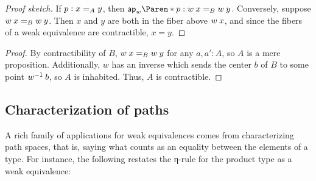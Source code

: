 \documentclass[./thesis.tex]{subfiles}
\begin{document}
\begin{proof}[Proof sketch]
  If $p:\propeq{A}{x}{y}$, then
  $\ap{w}{p}:\propeq{B}{\apply{w}{x}}{\apply{w}{y}}$. Conversely,
  suppose $\propeq{B}{\apply{w}{x}}{\apply{w}{y}}$.
  Then $x$ and $y$ are both in the fiber above $\apply{w}{x}$,
  and since the fibers of a weak equivalence are contractible, $x=y$.
\end{proof}

\begin{proof}
  By contractibility of $B$, 
  $\propeq{B}{\apply{w}{x}}{\apply{w}{y}}$ for any $a,a':A$, so $A$
  is a mere proposition. Additionally, $w$ has an inverse which sends the center
  $b$ of $B$ to some point $\apply{w^{-1}}{b}$, so $A$ is inhabited.
  Thus, $A$ is contractible.
\end{proof}


\subsection{Characterization of paths}
\label{subsec:characterization-of-paths}

A rich family of applications for weak equivalences comes from characterizing
path spaces, that is, saying what counts as an equality between the elements of
a type. For instance, the following restates the η-rule for the product type as
a weak equivalence:

\end{document}
